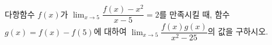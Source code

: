 다항함수 $f(x)$가 $\displaystyle\lim_{x\to 5}\dfrac{f(x)-x^2}{x-5}=2$를 만족시킬 때, 함수 $g(x)=f(x)-f(5)$에 대하여 $\displaystyle\lim_{x\to 5}\dfrac{f(x)g(x)}{x^2-25}$의 값을 구하시오.
